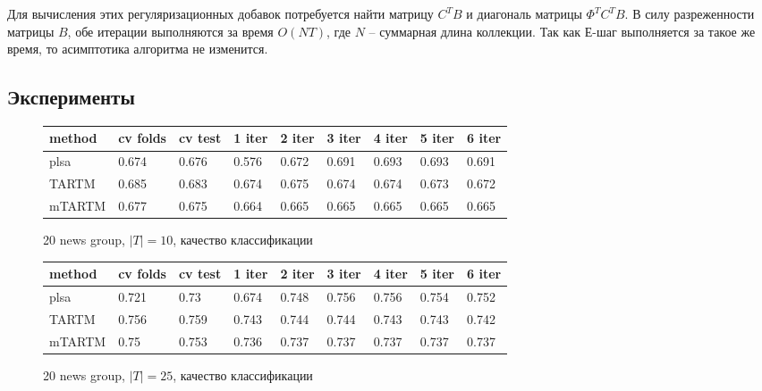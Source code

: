 \documentclass[12pt]{article}
\begin{document}
Для вычисления этих регуляризационных добавок потребуется найти матрицу  $C^T B$ и диагональ матрицы $\Phi^T C^T B$. В силу разреженности матрицы $B$, обе итерации выполняются за время $O(N T)$, где $N$ -- суммарная длина коллекции. Так как Е-шаг выполняется за такое же время, то асимптотика алгоритма не изменится.

\subsection{Эксперименты}

\begin{figure}[htb]
    \begin{tabular}{| l | l | l | l | l | l | l | l | l |}
    \hline
    method & cv folds & cv test &  1 iter &  2 iter &  3 iter &  4 iter &  5 iter&  6 iter   \\ \hline
    plsa & 0.674 & 0.676 & 0.576 & 0.672 & 0.691 & 0.693 & 0.693 & 0.691 \\ \hline
TARTM & 0.685 & 0.683 & 0.674 & 0.675 & 0.674 & 0.674 & 0.673 & 0.672 \\ \hline
mTARTM & 0.677 & 0.675 & 0.664 & 0.665 & 0.665 & 0.665 & 0.665 & 0.665 \\ \hline
    \end{tabular}
    \caption{20 news group, $|T| = 10$, качество классификации}
\end{figure}

\begin{figure}[htb]
    \begin{tabular}{| l | l | l | l | l | l | l | l | l |}
    \hline
    method & cv folds & cv test &  1 iter &  2 iter &  3 iter &  4 iter &  5 iter&  6 iter   \\ \hline
    plsa & 0.721 & 0.73 & 0.674 & 0.748 & 0.756 & 0.756 & 0.754 & 0.752 \\ \hline
TARTM & 0.756 & 0.759 & 0.743 & 0.744 & 0.744 & 0.743 & 0.743 & 0.742 \\ \hline
mTARTM & 0.75 & 0.753 & 0.736 & 0.737 & 0.737 & 0.737 & 0.737 & 0.737 \\ \hline
    \end{tabular}
    \caption{20 news group, $|T| = 25$, качество классификации}
\end{figure}
\end{document}

